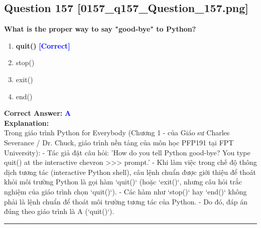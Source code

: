 \documentclass[11pt,a4paper]{article}
\begin{document}
\begin{minipage}{\textwidth}
\subsection*{Question 157 \quad \footnotesize{[0157_q157_Question_157.png]}}
\noindent \textbf{What is the proper way to say "good-bye" to Python?}

\begin{enumerate}[label=\Alph*.]
    \item \textbf{quit()} \hfill \textcolor{blue}{\textbf{[Correct]}}
    \item stop()
    \item exit()
    \item end()
\end{enumerate}

\noindent \textbf{Correct Answer:} \textcolor{blue}{\textbf{A}} \\[4pt]
\noindent \textbf{Explanation:}\\
Trong giáo trình Python for Everybody (Chương 1 - của Giáo sư Charles Severance / Dr. Chuck, giáo trình nền tảng của môn học PFP191 tại FPT University):\newline
- Tác giả đặt câu hỏi: 'How do you tell Python good-bye? You type quit() at the interactive chevron >>> prompt.'\newline
- Khi làm việc trong chế độ thông dịch tương tác (interactive Python shell), câu lệnh chuẩn được giới thiệu để thoát khỏi môi trường Python là gọi hàm `quit()` (hoặc `exit()`, nhưng câu hỏi trắc nghiệm của giáo trình chọn `quit()`).\newline
- Các hàm như `stop()` hay `end()` không phải là lệnh chuẩn để thoát môi trường tương tác của Python.\newline
- Do đó, đáp án đúng theo giáo trình là A (`quit()`).
\end{minipage}
\vspace{0.8cm}
\hrule
\vspace{0.5cm}
\end{document}
